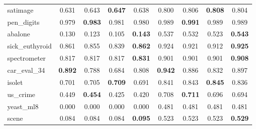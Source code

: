 \begin{figure}[ht]
\begin{tabular}{p{22mm}|*4{p{14mm}}|*4{p{14mm}}}
        satimage&\multicolumn{1}{c}{0.631}&\multicolumn{1}{c}{0.643}&\multicolumn{1}{c}{\textbf{0.647}}&\multicolumn{1}{c|}{0.638}&\multicolumn{1}{c}{0.800}&\multicolumn{1}{c}{0.806}&\multicolumn{1}{c}{\textbf{0.808}}&\multicolumn{1}{c}{0.804}\\
        pen\_digits&\multicolumn{1}{c}{0.979}&\multicolumn{1}{c}{\textbf{0.983}}&\multicolumn{1}{c}{0.981}&\multicolumn{1}{c|}{0.980}&\multicolumn{1}{c}{0.989}&\multicolumn{1}{c}{\textbf{0.991}}&\multicolumn{1}{c}{0.989}&\multicolumn{1}{c}{0.989}\\
        abalone&\multicolumn{1}{c}{0.130}&\multicolumn{1}{c}{0.123}&\multicolumn{1}{c}{0.105}&\multicolumn{1}{c|}{\textbf{0.143}}&\multicolumn{1}{c}{0.537}&\multicolumn{1}{c}{0.532}&\multicolumn{1}{c}{0.523}&\multicolumn{1}{c}{\textbf{0.543}}\\
        sick\_euthyroid&\multicolumn{1}{c}{0.861}&\multicolumn{1}{c}{0.855}&\multicolumn{1}{c}{0.839}&\multicolumn{1}{c|}{\textbf{0.862}}&\multicolumn{1}{c}{0.924}&\multicolumn{1}{c}{0.921}&\multicolumn{1}{c}{0.912}&\multicolumn{1}{c}{\textbf{0.925}}\\
        spectrometer&\multicolumn{1}{c}{0.817}&\multicolumn{1}{c}{0.817}&\multicolumn{1}{c}{0.817}&\multicolumn{1}{c|}{\textbf{0.831}}&\multicolumn{1}{c}{0.901}&\multicolumn{1}{c}{0.901}&\multicolumn{1}{c}{0.901}&\multicolumn{1}{c}{\textbf{0.908}}\\
        car\_eval\_34&\multicolumn{1}{c}{\textbf{0.892}}&\multicolumn{1}{c}{0.788}&\multicolumn{1}{c}{0.684}&\multicolumn{1}{c|}{0.808}&\multicolumn{1}{c}{\textbf{0.942}}&\multicolumn{1}{c}{0.886}&\multicolumn{1}{c}{0.832}&\multicolumn{1}{c}{0.897}\\
        isolet&\multicolumn{1}{c}{0.701}&\multicolumn{1}{c}{0.705}&\multicolumn{1}{c}{\textbf{0.709}}&\multicolumn{1}{c|}{0.691}&\multicolumn{1}{c}{0.841}&\multicolumn{1}{c}{0.843}&\multicolumn{1}{c}{\textbf{0.845}}&\multicolumn{1}{c}{0.836}\\
        us\_crime&\multicolumn{1}{c}{0.449}&\multicolumn{1}{c}{\textbf{0.454}}&\multicolumn{1}{c}{0.425}&\multicolumn{1}{c|}{0.420}&\multicolumn{1}{c}{0.708}&\multicolumn{1}{c}{\textbf{0.711}}&\multicolumn{1}{c}{0.696}&\multicolumn{1}{c}{0.694}\\
        yeast\_ml8&\multicolumn{1}{c}{0.000}&\multicolumn{1}{c}{0.000}&\multicolumn{1}{c}{0.000}&\multicolumn{1}{c|}{0.000}&\multicolumn{1}{c}{0.481}&\multicolumn{1}{c}{0.481}&\multicolumn{1}{c}{0.481}&\multicolumn{1}{c}{0.481}\\
        scene&\multicolumn{1}{c}{0.084}&\multicolumn{1}{c}{0.084}&\multicolumn{1}{c}{0.084}&\multicolumn{1}{c|}{\textbf{0.095}}&\multicolumn{1}{c}{0.523}&\multicolumn{1}{c}{0.523}&\multicolumn{1}{c}{0.523}&\multicolumn{1}{c}{\textbf{0.529}}\\

\end{tabular}
\end{figure}
